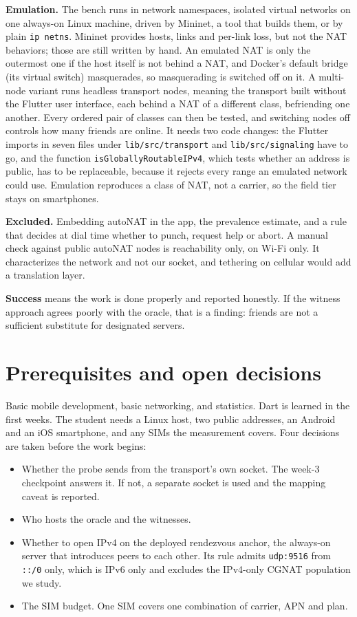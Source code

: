\documentclass[11pt]{article}
\newcommand{\code}[1]{\texttt{\small #1}}
\begin{document}
\textbf{Emulation.} The bench runs in network namespaces, isolated virtual networks on one always-on Linux machine, driven by Mininet, a tool that builds them, or by plain \code{ip netns}. Mininet provides hosts, links and per-link loss, but not the NAT behaviors; those are still written by hand. An emulated NAT is only the outermost one if the host itself is not behind a NAT, and Docker's default bridge (its virtual switch) masquerades, so masquerading is switched off on it. A multi-node variant runs headless transport nodes, meaning the transport built without the Flutter user interface, each behind a NAT of a different class, befriending one another. Every ordered pair of classes can then be tested, and switching nodes off controls how many friends are online. It needs two code changes: the Flutter imports in seven files under \code{lib/src/transport} and \code{lib/src/signaling} have to go, and the function \code{isGloballyRoutableIPv4}, which tests whether an address is public, has to be replaceable, because it rejects every range an emulated network could use. Emulation reproduces a class of NAT, not a carrier, so the field tier stays on smartphones.

\textbf{Excluded.} Embedding autoNAT in the app, the prevalence estimate, and a rule that decides at dial time whether to punch, request help or abort. A manual check against public autoNAT nodes is reachability only, on Wi-Fi only. It characterizes the network and not our socket, and tethering on cellular would add a translation layer.

\textbf{Success} means the work is done properly and reported honestly. If the witness approach agrees poorly with the oracle, that is a finding: friends are not a sufficient substitute for designated servers.

\section{Prerequisites and open decisions}

Basic mobile development, basic networking, and statistics. Dart is learned in the first weeks. The student needs a Linux host, two public addresses, an Android and an iOS smartphone, and any SIMs the measurement covers. Four decisions are taken before the work begins:
\begin{itemize}
  \item Whether the probe sends from the transport's own socket. The week-3 checkpoint answers it. If not, a separate socket is used and the mapping caveat is reported.
  \item Who hosts the oracle and the witnesses.
  \item Whether to open IPv4 on the deployed rendezvous anchor, the always-on server that introduces peers to each other. Its rule admits \code{udp:9516} from \code{::/0} only, which is IPv6 only and excludes the IPv4-only CGNAT population we study.
  \item The SIM budget. One SIM covers one combination of carrier, APN and plan.
\end{itemize}
\end{document}
